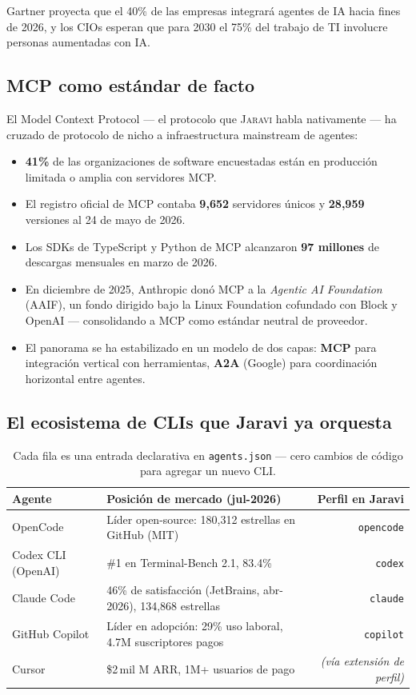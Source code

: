\documentclass[11pt]{article}
\newcommand{\jaravi}{\textsc{Jaravi}\xspace}
\begin{document}
Gartner proyecta que el 40\% de las empresas integrará agentes de IA hacia fines de 2026, y los CIOs esperan que para 2030 el 75\% del trabajo de TI involucre personas aumentadas con IA.

\subsection{MCP como estándar de facto}
El Model Context Protocol --- el protocolo que \jaravi habla nativamente --- ha cruzado de protocolo de nicho a infraestructura mainstream de agentes:

\begin{itemize}
\item \textbf{41\%} de las organizaciones de software encuestadas están en producción limitada o amplia con servidores MCP.
\item El registro oficial de MCP contaba \textbf{9{,}652} servidores únicos y \textbf{28{,}959} versiones al 24 de mayo de 2026.
\item Los SDKs de TypeScript y Python de MCP alcanzaron \textbf{97 millones} de descargas mensuales en marzo de 2026.
\item En diciembre de 2025, Anthropic donó MCP a la \emph{Agentic AI Foundation} (AAIF), un fondo dirigido bajo la Linux Foundation cofundado con Block y OpenAI --- consolidando a MCP como estándar neutral de proveedor.
\item El panorama se ha estabilizado en un modelo de dos capas: \textbf{MCP} para integración vertical con herramientas, \textbf{A2A} (Google) para coordinación horizontal entre agentes.
\end{itemize}

\subsection{El ecosistema de CLIs que Jaravi ya orquesta}
\begin{table}[h]
\centering
\small
\begin{tabularx}{\textwidth}{l X r}
\toprule
\textbf{Agente} & \textbf{Posición de mercado (jul-2026)} & \textbf{Perfil en Jaravi} \\
\midrule
OpenCode & Líder open-source: 180{,}312 estrellas en GitHub (MIT) & \texttt{opencode} \\
Codex CLI (OpenAI) & \#1 en Terminal-Bench 2.1, 83.4\% & \texttt{codex} \\
Claude Code & 46\% de satisfacción (JetBrains, abr-2026), 134{,}868 estrellas & \texttt{claude} \\
GitHub Copilot & Líder en adopción: 29\% uso laboral, 4.7M suscriptores pagos & \texttt{copilot} \\
Cursor & \$2\,mil M ARR, 1M+ usuarios de pago & \emph{(vía extensión de perfil)} \\
\bottomrule
\end{tabularx}
\caption{Cada fila es una entrada declarativa en \texttt{agents.json} --- cero cambios de código para agregar un nuevo CLI.}
\end{table}
\end{document}

